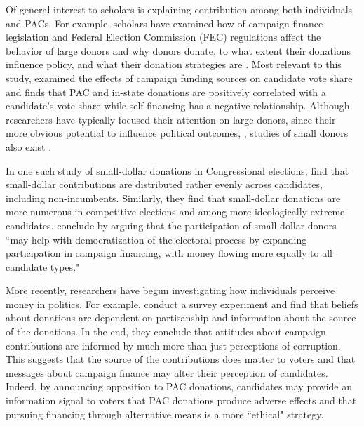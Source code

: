 \documentclass[12pt]{article}
\begin{document}
 Of general interest to scholars is explaining contribution among both individuals and PACs.  For example, scholars have examined how of campaign finance legislation and Federal Election Commission (FEC) regulations affect the behavior of large donors \citep{magleby_money_2010, raja_small_2008} and why donors donate, to what extent their donations influence policy, and what their donation strategies are \citep{francia_financiers_2003}. Most relevant to this study, \citet{alexander_good_2005} examined the effects of campaign funding sources on candidate vote share and finds that PAC and in-state donations are positively correlated with a candidate's vote share while self-financing has a negative relationship. Although researchers have typically focused their attention on large donors, since their more obvious potential to influence political outcomes, \citep{barber_ideologically_2017, francia_financiers_2003}, studies of small donors also exist \citep{johnson_individual_2010, lipsitz_filled_2011}.  
 
 In one such study of small-dollar donations in Congressional elections, \citep{culberson_small_2019} find that small-dollar contributions are distributed rather evenly across candidates, including non-incumbents. Similarly, they find that small-dollar donations are more numerous in competitive elections and among more ideologically extreme candidates. \citep{culberson_small_2019} conclude by arguing that the participation of small-dollar donors ``may help with democratization of the electoral process by expanding participation in campaign financing, with money flowing more equally to all candidate types."   
 
 More recently, researchers have begun investigating how individuals perceive money in politics. For example, \citet{bowler_campaign_2016} conduct a survey experiment and find that beliefs about donations are dependent on partisanship and information about the source of the donations. In the end, they conclude that attitudes about campaign contributions are informed by much more than just perceptions of corruption. This suggests that the source of the contributions does matter to voters and that messages about campaign finance may alter their perception of candidates. Indeed, by announcing opposition to PAC donations, candidates may provide an information signal to voters that PAC donations produce adverse effects and that pursuing financing through alternative means is a more ``ethical" strategy. 
 
\end{document}
